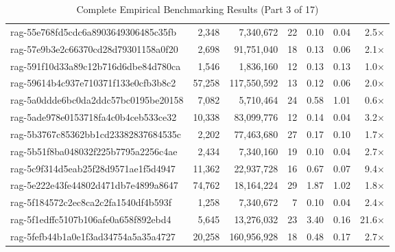 \begin{table}[h!]
\begin{tabular}{lrrrrrr}
rag-55e768fd5cdc6a8903649306485c35fb & 2,348 & 7,340,672 & 22 & 0.10 & 0.04 & 2.5$\times$ \\
rag-57e9b3e2c66370cd28d79301158a0f20 & 2,698 & 91,751,040 & 18 & 0.13 & 0.06 & 2.1$\times$ \\
rag-591f10d33a89c12b716d6dbe84d780ca & 1,546 & 1,836,160 & 12 & 0.13 & 0.13 & 1.0$\times$ \\
rag-59614b4c937e710371f133e0cfb3b8c2 & 57,258 & 117,550,592 & 13 & 0.12 & 0.06 & 2.0$\times$ \\
rag-5a0ddde6bc0da2ddc57bc0195be20158 & 7,082 & 5,710,464 & 24 & 0.58 & 1.01 & 0.6$\times$ \\
rag-5ade978e0153718fa4c0b4ceb533ce32 & 10,338 & 83,099,776 & 12 & 0.14 & 0.04 & 3.2$\times$ \\
rag-5b3767c85362bb1cd23382837684535c & 2,202 & 77,463,680 & 27 & 0.17 & 0.10 & 1.7$\times$ \\
rag-5b51f8ba048032f225b7795a2256c4ae & 2,434 & 7,340,160 & 19 & 0.10 & 0.04 & 2.7$\times$ \\
rag-5c9f314d5eab25f28d9571ae1f5d4947 & 11,362 & 22,937,728 & 16 & 0.67 & 0.07 & 9.4$\times$ \\
rag-5e222e43fe44802d471db7e4899a8647 & 74,762 & 18,164,224 & 29 & 1.87 & 1.02 & 1.8$\times$ \\
rag-5f184572c2ec8ca2c2fa1540df4b593f & 1,258 & 7,340,672 & 7 & 0.10 & 0.04 & 2.4$\times$ \\
rag-5f1edffc5107b106afe0a658f892ebd4 & 5,645 & 13,276,032 & 23 & 3.40 & 0.16 & 21.6$\times$ \\
rag-5fefb44b1a0e1f3ad34754a5a35a4727 & 20,258 & 160,956,928 & 18 & 0.48 & 0.17 & 2.7$\times$ \\
\bottomrule
\end{tabular}
\caption{Complete Empirical Benchmarking Results (Part 3 of 17)}
\end{table}

\clearpage

